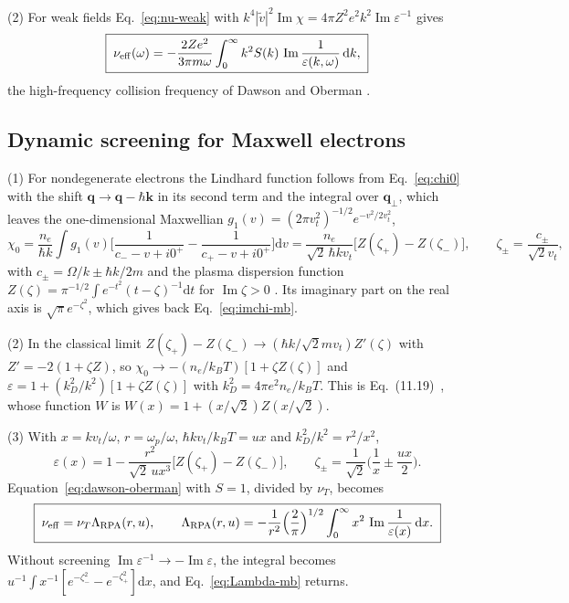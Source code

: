 \documentclass[11pt]{article}
\numberwithin{equation}{section}
\newcommand{\kv}{\mathbf k}
\newcommand{\nuT}{\nu_T}
\newcommand{\nueff}{\nu_{\rm eff}}
\newcommand{\dd}{\mathrm d}
\newcommand{\kB}{k_B}
\DeclareMathOperator{\Imag}{Im}
\begin{document}
{\noindent}(2) For weak fields Eq.~\eqref{eq:nu-weak} with
$k^4|\tilde v|^2\Imag\chi=4\pi Z^2e^2k^2\Imag\varepsilon^{-1}$ gives
\begin{equation}
\boxed{\;\nueff(\omega)=-\frac{2Ze^2}{3\pi m\omega}\int_0^\infty k^2S(k)\,\Imag\frac{1}{\varepsilon(k,\omega)}\,\dd k,\;}
\label{eq:dawson-oberman}
\end{equation}
the high-frequency collision frequency of Dawson and Oberman
\cite{DawsonOberman1962}.

\subsection{Dynamic screening for Maxwell electrons}
\label{sec:rpa}
{\noindent}(1) For nondegenerate electrons the Lindhard function follows from
Eq.~\eqref{eq:chi0} with the shift $\mathbf q\to\mathbf q-\hbar\kv$ in its
second term and the integral over $\mathbf q_\perp$, which leaves the
one-dimensional Maxwellian $g_1(v)=(2\pi v_t^2)^{-1/2}e^{-v^2/2v_t^2}$,
\begin{equation}
\chi_0=\frac{n_e}{\hbar k}\int g_1(v)\Big[\frac{1}{c_--v+i0^+}-\frac{1}{c_+-v+i0^+}\Big]\dd v
=\frac{n_e}{\sqrt2\,\hbar kv_t}\big[Z(\zeta_+)-Z(\zeta_-)\big],\qquad
\zeta_\pm=\frac{c_\pm}{\sqrt2v_t},
\label{eq:chi0-Z}
\end{equation}
with $c_\pm=\Omega/k\pm\hbar k/2m$ and the plasma dispersion function
$Z(\zeta)=\pi^{-1/2}\int e^{-t^2}(t-\zeta)^{-1}\dd t$ for $\Imag\zeta>0$
\cite{FriedConte1961}. Its imaginary part on the real axis is
$\sqrt\pi e^{-\zeta^2}$, which gives back Eq.~\eqref{eq:imchi-mb}.

{\noindent}(2) In the classical limit $Z(\zeta_+)-Z(\zeta_-)\to(\hbar k/\sqrt2mv_t)Z'(\zeta)$
with $Z'=-2(1+\zeta Z)$, so $\chi_0\to-(n_e/\kB T)[1+\zeta Z(\zeta)]$ and
$\varepsilon=1+(k_D^2/k^2)[1+\zeta Z(\zeta)]$ with $k_D^2=4\pi e^2n_e/\kB T$. This is
Eq.~(11.19)~\cite{Atzeni2004}, whose function $W$ is $W(x)=1+(x/\sqrt2)Z(x/\sqrt2)$.

{\noindent}(3) With $x=kv_t/\omega$, $r=\omega_p/\omega$, $\hbar kv_t/\kB T=ux$ and
$k_D^2/k^2=r^2/x^2$,
\begin{equation}
\varepsilon(x)=1-\frac{r^2}{\sqrt2\,ux^3}\big[Z(\zeta_+)-Z(\zeta_-)\big],\qquad
\zeta_\pm=\frac{1}{\sqrt2}\Big(\frac1x\pm\frac{ux}{2}\Big).
\end{equation}
Equation~\eqref{eq:dawson-oberman} with $S=1$, divided by $\nuT$, becomes
\begin{equation}
\boxed{\;\nueff=\nuT\Lambda_{\rm RPA}(r,u),\qquad
\Lambda_{\rm RPA}(r,u)=-\frac{1}{r^2}\Big(\frac2\pi\Big)^{1/2}\int_0^\infty x^2\,\Imag\frac{1}{\varepsilon(x)}\,\dd x.\;}
\label{eq:Lambda-rpa}
\end{equation}
Without screening $\Imag\varepsilon^{-1}\to-\Imag\varepsilon$, the integral
becomes $u^{-1}\int x^{-1}[e^{-\zeta_-^2}-e^{-\zeta_+^2}]\dd x$, and
Eq.~\eqref{eq:Lambda-mb} returns.
\end{document}
